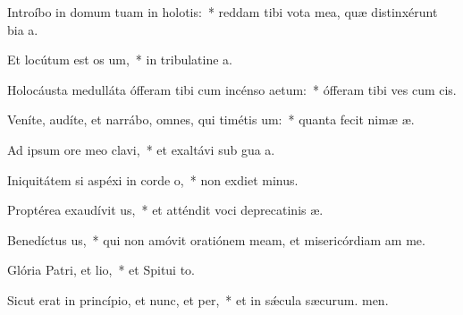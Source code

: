 \item Introíbo in domum tuam in holotis:~* reddam tibi vota mea, quæ distinxérunt bia a.
\item Et locútum est os um,~* in tribulatine a.
\item Holocáusta medulláta ófferam tibi cum incénso aetum:~* ófferam tibi ves cum cis.
\item Veníte, audíte, et narrábo, omnes, qui timétis um:~* quanta fecit nimæ æ.
\item Ad ipsum ore meo clavi,~* et exaltávi sub gua a.
\item Iniquitátem si aspéxi in corde o,~* non exdiet minus.
\item Proptérea exaudívit us,~* et atténdit voci deprecatinis æ.
\item Benedíctus us,~* qui non amóvit oratiónem meam, et misericórdiam am  me.
\item Glória Patri, et lio,~* et Spitui to.
\item Sicut erat in princípio, et nunc, et per,~* et in sǽcula sæcurum. men.
